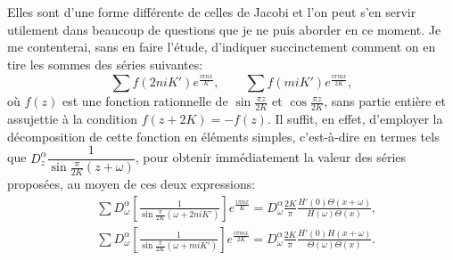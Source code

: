 \documentclass[11pt,leqno,oneside,letterpaper]{book}[2005/09/16]
\begin{document}
Elles sont d'une forme diff\'erente de celles de Jacobi et l'on peut
s'en servir utilement dans beaucoup de questions que je ne puis aborder
en ce moment. Je me contenterai, sans en faire l'\'etude, d'indiquer succinctement
comment on en tire les sommes des s\'eries suivantes:
\[
  \sum f(2niK') e^{\frac{i\pi nx}{ K}}, \qquad
  \sum f( miK') e^{\frac{i\pi mx}{2K}},
\]
o\`u $f(z)$ est une fonction rationnelle de
$\sin \frac{\pi z}{2K}$ et
$\cos \frac{\pi z}{2K}$, sans partie enti\`ere
et assujettie \`a la condition $f(z+2K) = - f(z)$. Il suffit, en effet,
d'employer la d\'ecomposition de cette fonction en \'el\'ements simples,
c'est-\`a-dire en termes tels que
$D_z^{\alpha} \dfrac{1}{\sin\frac{\pi}{2K}(z+\omega)}$,
pour obtenir imm\'ediatement
la valeur des s\'eries propos\'ees, au moyen de ces deux expressions:
\begin{align*}
& \sum D_{\omega}^{\alpha}
  \left[ \frac{1}{ \sin\frac{\pi}{2K} (\omega+2niK') } \right]
  e^{\frac{i\pi nx}{K}}
=  D_{\omega}^{\alpha} \frac{2K}{\pi}
   \frac{ H'(0) \Theta(x+\omega) }{ H(\omega) \Theta(x) } ,
\\
& \sum D_{\omega}^{\alpha}
  \left[ \frac{1}{ \sin\frac{\pi}{2K} (\omega+ miK') } \right]
  e^{\frac{i\pi mx}{2K}}
=  D_{\omega}^{\alpha} \frac{2K}{\pi}
   \frac{ H'(0) H(x+\omega) }{ \Theta(\omega) \Theta(x) } .
\end{align*}
\end{document}
